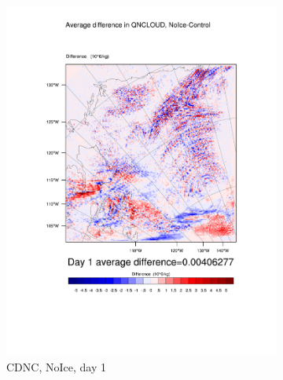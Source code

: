 \begin{figure}[hb]
\begin{subfigure}{0.30\textwidth}
		\includegraphics[width=\textwidth]{results/noice/diff_NoIce_QNCLOUD_Day1.pdf}
		\caption{CDNC, NoIce, day 1}
		\label{subfig:CDNCr2Day1}
	\end{subfigure}
	\begin{subfigure}{0.30\textwidth}
		\centering

\end{subfigure}
\end{figure}

